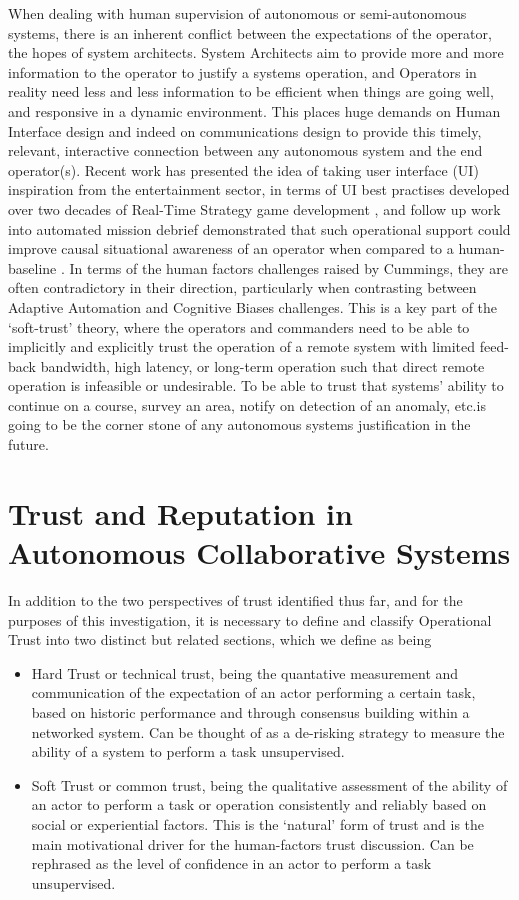 When dealing with human supervision of autonomous or semi-autonomous systems, there is an inherent conflict between the expectations of the operator, the hopes of system architects.
System Architects aim to provide more and more information to the operator to justify a systems operation, and Operators in reality need less and less information to be efficient when things are going well, and responsive in a dynamic environment.
This places huge demands on Human Interface design and indeed on communications design to provide this timely, relevant, interactive connection between any autonomous system and the end operator(s).
Recent work has presented the idea of taking user interface (UI) inspiration from the entertainment sector, in terms of UI best practises developed over two decades of Real-Time Strategy game development \cite{Johnson2007}, and follow up work into automated mission debrief demonstrated that such operational support could improve causal situational awareness of an operator when compared to a human-baseline \cite{Johnson2011}.
In terms of the human factors challenges raised by Cummings, they are often contradictory in their direction, particularly when contrasting between Adaptive Automation and Cognitive Biases challenges.
This is a key part of the ‘soft-trust’ theory, where the operators and commanders need to be able to implicitly and explicitly trust the operation of a remote system with limited feed-back bandwidth, high latency, or long-term operation such that direct remote operation is infeasible or undesirable.
To be able to trust that systems’ ability to continue on a course, survey an area, notify on detection of an anomaly, etc.is going to be the corner stone of any autonomous systems justification in the future.

\section{Trust and Reputation in Autonomous Collaborative Systems}

In addition to the two perspectives of trust identified thus far, and for the purposes of this investigation, it is necessary to define and classify Operational Trust into two distinct but related sections, which we define as being

\begin{itemize}
  \item Hard Trust or technical trust, being the quantative measurement and communication of the expectation of an actor performing a certain task, based on historic performance and through consensus building within a networked system.
    Can be thought of as a de-risking strategy to measure the ability of a system to perform a task unsupervised.

  \item Soft Trust or common trust, being the qualitative assessment of the ability of an actor to perform a task or operation consistently and reliably based on social or experiential factors.
    This is the ‘natural’ form of trust and is the main motivational driver for the human-factors trust discussion.
    Can be rephrased as the level of confidence in an actor to perform a task unsupervised.
\end{itemize}

